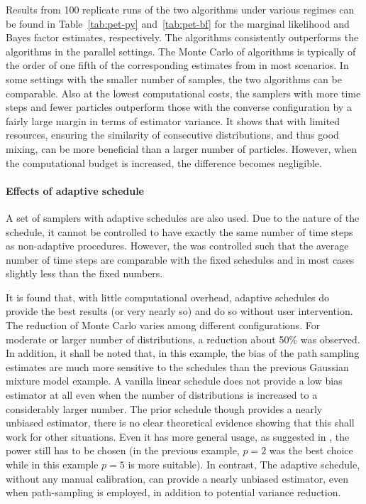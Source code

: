 Results from 100 replicate runs of the two algorithms under various regimes
can be found in Table~\ref{tab:pet-py} and~\ref{tab:pet-bf} for the marginal
likelihood and Bayes factor estimates, respectively. The \smc algorithms
consistently outperforms the \pmcmc algorithms in the parallel settings. The
Monte Carlo \sd of \smc algorithms is typically of the order of one fifth of
the corresponding estimates from \pmcmc in most scenarios. In some settings
with the smaller number of samples, the two algorithms can be comparable. Also
at the lowest computational costs, the samplers with more time steps and fewer
particles outperform those with the converse configuration by a fairly large
margin in terms of estimator variance. It shows that with limited resources,
ensuring the similarity of consecutive distributions, and thus good mixing,
can be more beneficial than a larger number of particles. However, when the
computational budget is increased, the difference becomes negligible.




\paragraph{Effects of adaptive schedule}

A set of samplers with adaptive schedules are also used. Due to the nature of
the schedule, it cannot be controlled to have exactly the same number of time
steps as non-adaptive procedures. However, the \cess was controlled such that
the average number of time steps are comparable with the fixed schedules and
in most cases slightly less than the fixed numbers.

It is found that, with little computational overhead, adaptive schedules do
provide the best results (or very nearly so) and do so without user
intervention. The reduction of Monte Carlo \sd varies among different
configurations. For moderate or larger number of distributions, a reduction
about 50\% was observed. In addition, it shall be noted that, in this example,
the bias of the path sampling estimates are much more sensitive to the
schedules than the previous Gaussian mixture model example. A vanilla linear
schedule does not provide a low bias estimator at all even when the number of
distributions is increased to a considerably larger number. The prior schedule
though provides a nearly unbiased estimator, there is no clear theoretical
evidence showing that this shall work for other situations. Even it has more
general usage, as suggested in \cite{Calderhead:2009bd}, the power still has
to be chosen (in the previous \gmm example, $p = 2$ was the best choice while
in this \pet example $p = 5$ is more suitable). In contrast, The adaptive
schedule, without any manual calibration, can provide a nearly unbiased
estimator, even when path-sampling is employed, in addition to potential
variance reduction.

